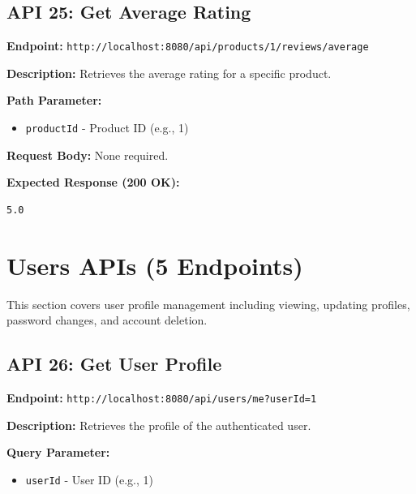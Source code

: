 \documentclass[12pt, a4paper]{article}
\begin{document}
\vspace{0.5cm}

\subsection{API 25: Get Average Rating}

\begin{tcolorbox}[colback=getcolor!10, colframe=getcolor, title=GET]
\textbf{Endpoint:} \texttt{http://localhost:8080/api/products/1/reviews/average}
\end{tcolorbox}

\textbf{Description:} Retrieves the average rating for a specific product.

\textbf{Path Parameter:}
\begin{itemize}
    \item \texttt{productId} - Product ID (e.g., 1)
\end{itemize}

\textbf{Request Body:} None required.

\textbf{Expected Response (200 OK):}
\begin{lstlisting}
5.0
\end{lstlisting}

\newpage

\section{Users APIs (5 Endpoints)}

This section covers user profile management including viewing, updating profiles, password changes, and account deletion.

\subsection{API 26: Get User Profile}

\begin{tcolorbox}[colback=getcolor!10, colframe=getcolor, title=GET]
\textbf{Endpoint:} \texttt{http://localhost:8080/api/users/me?userId=1}
\end{tcolorbox}

\textbf{Description:} Retrieves the profile of the authenticated user.

\textbf{Query Parameter:}
\begin{itemize}
    \item \texttt{userId} - User ID (e.g., 1)
\end{itemize}
\end{document}

